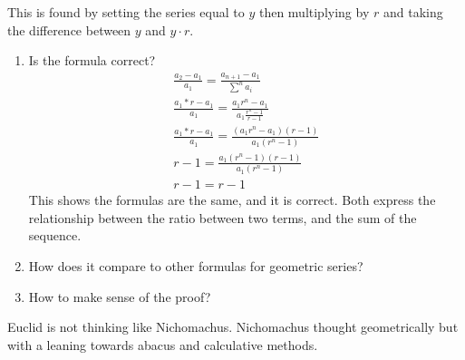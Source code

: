 \documentclass{report}
\begin{document}
\begin{description}
\begin{mdframed}
            This is found by setting the series equal to $y$ then
            multiplying by  $r$ and taking the difference
            between  $y$ and  $y \cdot r$. 
        \end{mdframed}
        \pagebreak
        \begin{mdframed}
           \begin{enumerate}
               \item Is the formula correct?
                   \begin{gather}
                       \frac{a_2-a_1}{a_1} = \frac{a_{n+1}-a_1}{\sum^n a_i}\\ 
                       \frac{a_1 * r - a_1}{a_1} = \frac{a_1 r^{n} - a_1}{a_1\frac{r^n-1}{r-1}}\\
                       \frac{a_1 * r - a_1}{a_1} = \frac{(a_1r^{n} - a_1)(r-1)}{a_1(r^n-1)}\\
                       r-1 = \frac{a_1(r^{n} - 1)(r-1)}{a_1(r^n-1)}\\
                       r-1 = r-1
                   \end{gather}
                   This shows the formulas are the same, and it is correct.
                   Both express the relationship between the ratio between
                   two terms, and the sum of the sequence.

               \item How does it compare to other formulas
                   for geometric series?
               \item How to make sense of the proof?
           \end{enumerate}

           Euclid is not thinking like Nichomachus. Nichomachus
           thought geometrically but with a leaning towards
           abacus and calculative methods.
        \end{mdframed}
\end{description}
\end{document}
